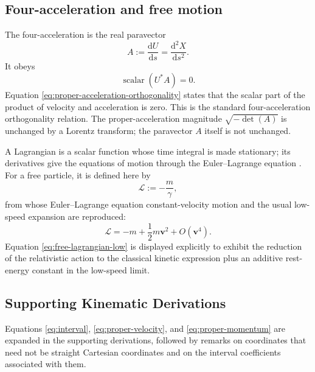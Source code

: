 \documentclass[10pt,letterpaper]{article}
\newcommand{\eqfunc}[1]{\operatorname{#1}}
\newcommand{\pv}[1]{#1}
\newcommand{\vct}[1]{\mathbf{#1}}
\newcommand{\conj}[1]{#1^{*}}
\newcommand{\detf}[1]{\eqfunc{det}\!\left(#1\right)}
\newcommand{\dd}{\mathrm d}
\begin{document}
\subsection{Four-acceleration and free motion}
The four-acceleration is the real paravector
\begin{equation}
\pv{A}:=\frac{\dd \pv{U}}{\dd s}
=\frac{\dd^2 \pv{X}}{\dd s^2}.
\label{eq:proper-acceleration}
\end{equation}
It obeys
\begin{equation}
\eqfunc{scalar}(\conj{\pv{U}}\pv{A})=0.
\label{eq:proper-acceleration-orthogonality}
\end{equation}
Equation \eqref{eq:proper-acceleration-orthogonality} states that the scalar
part of the product of velocity and acceleration is zero. This is the
standard four-acceleration orthogonality relation. The proper-acceleration
magnitude \(\sqrt{-\detf{\pv{A}}}\) is unchanged by a Lorentz transform; the
paravector \(\pv{A}\) itself is not unchanged.

A Lagrangian is a scalar function whose time integral is made stationary;
its derivatives give the equations of motion through the
Euler--Lagrange equation \cite{einstein1905,jackson1998}. For a free particle,
it is defined here by
\begin{equation}
\mathcal L:=-\frac{m}{\gamma},
\label{eq:free-lagrangian}
\end{equation}
from whose Euler--Lagrange equation constant-velocity motion and the usual
low-speed expansion are reproduced:
\begin{equation}
\mathcal L=-m+\frac{1}{2}m\vct{v}^2+O(\vct{v}^4).
\label{eq:free-lagrangian-low}
\end{equation}
Equation \eqref{eq:free-lagrangian-low} is displayed explicitly to exhibit the reduction of the relativistic action to the classical kinetic expression plus an additive rest-energy constant in the low-speed limit.

\subsection{Supporting Kinematic Derivations}
Equations \eqref{eq:interval}, \eqref{eq:proper-velocity}, and
\eqref{eq:proper-momentum} are expanded in the supporting derivations,
followed by remarks on coordinates that need not be straight Cartesian
coordinates and on the interval coefficients associated with them.


\end{document}
